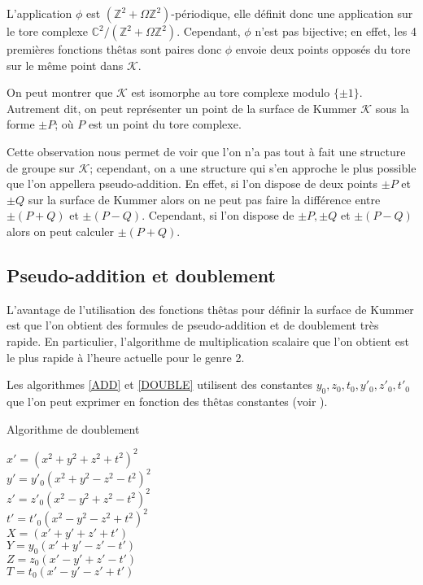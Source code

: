 \documentclass[a4paper]{article}
\theoremstyle{definition}
\theoremstyle{remark}
\numberwithin{equation}{section}
\begin{document}
L'application $\phi$ est $(\mathbb{Z}^2 + \Omega\mathbb{Z}^2)$-périodique, elle définit donc une application sur le tore complexe $\mathbb{C}^2/(\mathbb{Z}^2+\Omega\mathbb{Z}^2)$. Cependant, $\phi$ n'est pas bijective; en effet, les 4 premières fonctions thêtas sont paires donc $\phi$ envoie deux points opposés du tore sur le même point dans $\mathcal{K}$.

On peut montrer que $\mathcal{K}$ est isomorphe au tore complexe modulo $\{\pm 1\}$. Autrement dit, on peut représenter un point de la surface de Kummer $\mathcal{K}$ sous la forme $\pm P$; où $P$ est un point du tore complexe.

Cette observation nous permet de voir que l'on n'a pas tout à fait une structure de groupe sur $\mathcal{K}$; cependant, on a une structure qui s'en approche le plus possible que l'on appellera pseudo-addition. En effet, si l'on dispose de deux points $\pm P$ et $\pm Q$ sur la surface de Kummer alors on ne peut pas faire la différence entre $\pm(P+Q)$ et $\pm(P-Q)$. Cependant, si l'on dispose de $\pm P,\pm Q$ et $\pm(P-Q)$ alors on peut calculer $\pm(P+Q)$.

\subsection{Pseudo-addition et doublement}

L'avantage de l'utilisation des fonctions thêtas pour définir la surface de Kummer est que l'on obtient des formules de pseudo-addition et de doublement très rapide. En particulier, l'algorithme de multiplication scalaire que l'on obtient est le plus rapide à l'heure actuelle pour le genre 2.

Les algorithmes \ref{ADD} et \ref{DOUBLE} utilisent des constantes $y_0,z_0,t_0,y'_0,z'_0,t'_0$ que l'on peut exprimer en fonction des thêtas constantes (voir \citet{gaudry}).

\begin{algorithm}
\label{DOUBLE}
\caption{Algorithme de doublement}
$x' = (x^2 + y^2 + z^2 + t^2)^2$ \\
$y' = y'_0(x^2 + y^2 - z^2 - t^2)^2$ \\
$z' = z'_0(x^2 - y^2 + z^2 - t^2)^2$ \\
$t' = t'_0(x^2 - y^2 - z^2 + t^2)^2$ \\
$X = (x' + y' + z' + t')$ \\
$Y = y_0(x' + y' - z' - t')$ \\
$Z = z_0(x' - y' + z' - t')$ \\
$T = t_0(x' - y' - z' + t')$ \\
\end{algorithm}
\end{document}
